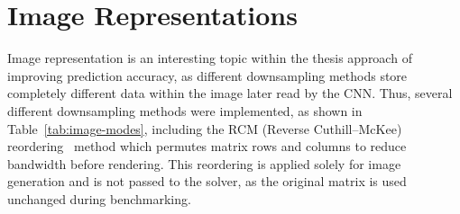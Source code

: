 \section{Image Representations}\label{sec:image-modes}

Image representation is an interesting topic within the thesis approach of improving prediction accuracy,
as different downsampling methods store completely different data within the image later read by the CNN.
Thus, several different downsampling methods were implemented, as shown in Table~\ref{tab:image-modes}, including
the RCM (Reverse Cuthill--McKee) reordering~\cite{cuthill1969reducing} method which permutes matrix rows and columns to reduce bandwidth before rendering.
This reordering is applied solely for image generation and is not passed to the solver, as the original matrix is used unchanged during benchmarking.

